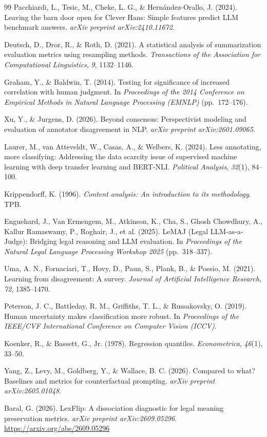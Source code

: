 \begin{thebibliography}{99}
Pacchiardi, L., Tesic, M., Cheke, L. G., \& Hern\'andez-Orallo, J. (2024).
Leaving the barn door open for Clever Hans: Simple features predict LLM
benchmark answers. \textit{arXiv preprint arXiv:2410.11672}.

Deutsch, D., Dror, R., \& Roth, D. (2021). A statistical analysis of
summarization evaluation metrics using resampling methods.
\textit{Transactions of the Association for Computational Linguistics},
\textit{9}, 1132--1146.

Graham, Y., \& Baldwin, T. (2014). Testing for significance of increased
correlation with human judgment. In \textit{Proceedings of the 2014 Conference
on Empirical Methods in Natural Language Processing (EMNLP)} (pp.~172--176).

Xu, Y., \& Jurgens, D. (2026). Beyond consensus: Perspectivist modeling and
evaluation of annotator disagreement in NLP. \textit{arXiv preprint
arXiv:2601.09065}.

Laurer, M., van Atteveldt, W., Casas, A., \& Welbers, K. (2024). Less
annotating, more classifying: Addressing the data scarcity issue of supervised
machine learning with deep transfer learning and BERT-NLI. \textit{Political
Analysis}, \textit{32}(1), 84--100.

Krippendorff, K. (1996). \textit{Content analysis: An introduction to its
methodology}. TPB.

Enguehard, J., Van Ermengem, M., Atkinson, K., Cha, S., Ghosh Chowdhury, A.,
Kallur Ramaswamy, P., Roghair, J., et al. (2025). LeMAJ (Legal LLM-as-a-Judge):
Bridging legal reasoning and LLM evaluation. In \textit{Proceedings of the
Natural Legal Language Processing Workshop 2025} (pp.~318--337).

Uma, A. N., Fornaciari, T., Hovy, D., Paun, S., Plank, B., \& Poesio, M. (2021).
Learning from disagreement: A survey. \textit{Journal of Artificial Intelligence
Research}, \textit{72}, 1385--1470.

Peterson, J. C., Battleday, R. M., Griffiths, T. L., \& Russakovsky, O. (2019).
Human uncertainty makes classification more robust. In \textit{Proceedings of
the IEEE/CVF International Conference on Computer Vision (ICCV)}.

Koenker, R., \& Bassett, G., Jr. (1978). Regression quantiles.
\textit{Econometrica}, \textit{46}(1), 33--50.

Yang, Z., Levy, M., Goldberg, Y., \& Wallace, B. C. (2026). Compared to what?
Baselines and metrics for counterfactual prompting. \textit{arXiv preprint
arXiv:2605.01048}.

Baral, G. (2026). LexFlip: A dissociation diagnostic for legal meaning
preservation metrics. \textit{arXiv preprint arXiv:2609.05296}.
\url{https://arxiv.org/abs/2609.05296}

\end{thebibliography}
